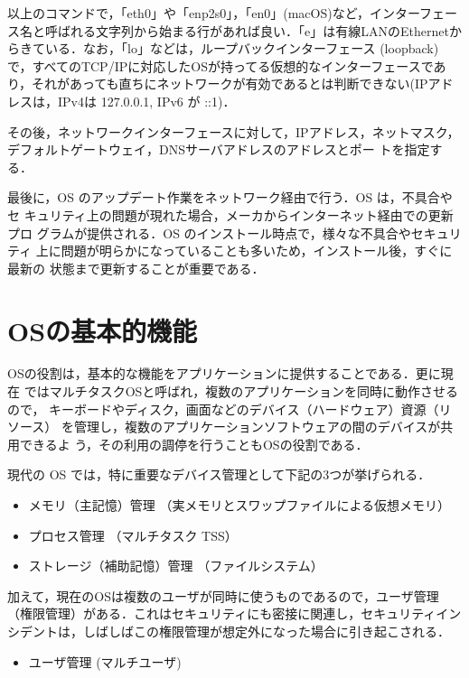 以上のコマンドで，「eth0」や「enp2s0」，「en0」(macOS)など，インターフェース名と呼ばれる文字列から始まる行があれば良い．「e」は有線LANのEthernetからきている．なお，「lo」などは，ループバックインターフェース (loopback) で，すべてのTCP/IPに対応したOSが持ってる仮想的なインターフェースであり，それがあっても直ちにネットワークが有効であるとは判断できない(IPアドレスは，IPv4は 127.0.0.1, IPv6 が ::1)．

その後，ネットワークインターフェースに対して，IPアドレス，ネットマスク，
デフォルトゲートウェイ，DNSサーバアドレスのアドレスとポー
トを指定する．

最後に，OS のアップデート作業をネットワーク経由で行う．OS は，不具合やセ
キュリティ上の問題が現れた場合，メーカからインターネット経由での更新プロ
グラムが提供される．OS のインストール時点で，様々な不具合やセキュリティ
上に問題が明らかになっていることも多いため，インストール後，すぐに最新の
状態まで更新することが重要である．

\section{OSの基本的機能}

OSの役割は，基本的な機能をアプリケーションに提供することである．更に現在
ではマルチタスクOSと呼ばれ，複数のアプリケーションを同時に動作させるので，
キーボードやディスク，画面などのデバイス（ハードウェア）資源（リソース）
を管理し，複数のアプリケーションソフトウェアの間のデバイスが共用できるよ
う，その利用の調停を行うこともOSの役割である．

現代の OS では，特に重要なデバイス管理として下記の3つが挙げられる．
\begin{itemize}
 \item メモリ（主記憶）管理 （実メモリとスワップファイルによる仮想メモリ）
 \item プロセス管理 （マルチタスク TSS）
 \item ストレージ（補助記憶）管理 （ファイルシステム）
\end{itemize}

加えて，現在のOSは複数のユーザが同時に使うものであるので，ユーザ管理（権限管理）がある．これはセキュリティにも密接に関連し，セキュリティインシデントは，しばしばこの権限管理が想定外になった場合に引き起こされる．

\begin{itemize}
    \item ユーザ管理 (マルチユーザ)
\end{itemize}

